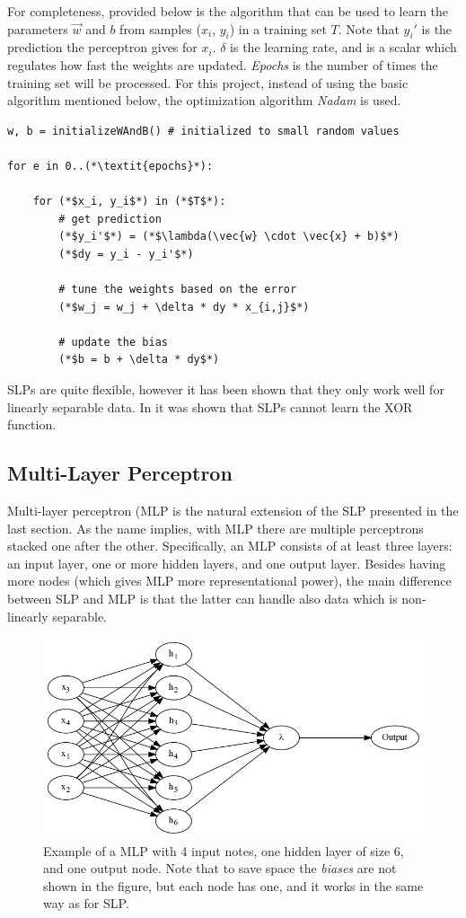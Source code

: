 \documentclass[epsfig,a4paper,11pt,titlepage,twoside,openany]{book}
\begin{document}
For completeness, provided below is the algorithm that can be used to learn the parameters $\vec{w}$ and $b$ from samples ($x_i$, $y_i$) in a training set $T$. Note that $y_i'$ is the prediction the perceptron gives for $x_i$. $\delta$ is the learning rate, and is a scalar which regulates how fast the weights are updated. \textit{Epochs} is the number of times the training set will be processed. For this project, instead of using the basic algorithm mentioned below, the optimization algorithm \textit{Nadam} \cite{dozat2016incorporating_nadam} is used.


\begin{lstlisting}
w, b = initializeWAndB() # initialized to small random values 

for e in 0..(*\textit{epochs}*):
    
    for (*$x_i, y_i$*) in (*$T$*):
        # get prediction
        (*$y_i'$*) = (*$\lambda(\vec{w} \cdot \vec{x} + b)$*)
        (*$dy = y_i - y_i'$*)
        
        # tune the weights based on the error
        (*$w_j = w_j + \delta * dy * x_{i,j}$*)
        
        # update the bias
        (*$b = b + \delta * dy$*)

\end{lstlisting}

SLPs are quite flexible, however it has been shown that they only work well for linearly separable data. In \cite{minsky2017_paupert_xor} it was shown that SLPs cannot learn the XOR function.   




\subsection{Multi-Layer Perceptron}
\label{sec:clf-mlp}


Multi-layer perceptron (MLP \cite{Goodfellow-et-al-2016} is the natural extension of the SLP presented in the last section. As the name implies, with MLP there are multiple perceptrons stacked one after the other. Specifically, an MLP consists of at least three layers: an input layer, one or more hidden layers, and one output layer. Besides having more nodes (which gives MLP more representational power), the main difference between SLP and MLP is that the latter can handle also data which is non-linearly separable.


\begin{figure}[H]
  \centering \includegraphics[width=.5\textwidth]{mlp-example} 
  \caption{Example of a MLP with 4 input notes, one hidden layer of size 6, and one output node. Note that to save space the \textit{biases} are not shown in the figure, but each node has one, and it works in the same way as for SLP.}
  \label{fig:mlp-example}
\end{figure}
\end{document}
